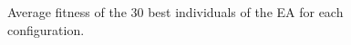 \documentclass{sig-alternate}
\begin{document}
\begin{figure}[htb]
\centering

\caption{Average fitness of the 30 best individuals of the EA for each configuration.}

\label{fig:graph}
\end{figure}
\end{document}
